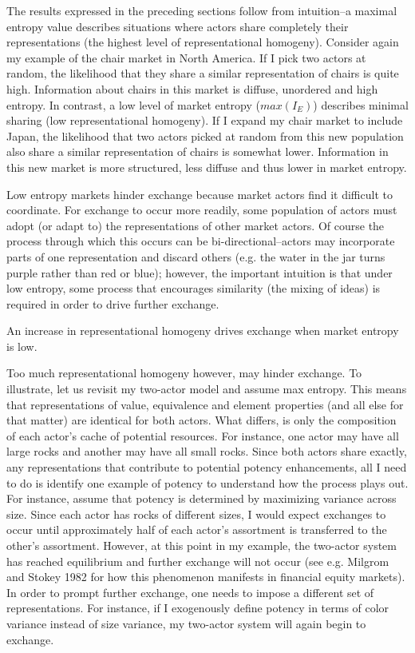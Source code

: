 The results expressed in the preceding sections follow from intuition--a maximal entropy value describes situations where actors share completely their representations (the highest level of representational homogeny). Consider again my example of the chair market in North America. If I pick two actors at random, the likelihood that they share a similar representation of chairs is quite high. Information about chairs in this market is diffuse, unordered and high entropy. In contrast, a low level of market entropy ($max(I_E)$) describes minimal sharing (low representational homogeny). If I expand my chair market to include Japan, the likelihood that two actors picked at random from this new population also share a similar representation of chairs is somewhat lower. Information in this new market is more structured, less diffuse and thus lower in market entropy. 
 
Low entropy markets hinder exchange because market actors find it difficult to coordinate. For exchange to occur more readily, some population of actors must adopt (or adapt to) the representations of other market actors. Of course the process through which this occurs can be bi-directional--actors may incorporate parts of one representation and discard others (e.g. the water in the jar turns purple rather than red or blue); however, the important intuition is that under low entropy, some process that encourages similarity (the mixing of ideas) is required in order to drive further exchange.
 
\begin{prop}
An increase in representational homogeny drives exchange when market entropy is low.
\end{prop}

Too much representational homogeny however, may hinder exchange. To illustrate, let us revisit my two-actor model and assume max entropy. This means that representations of value, equivalence and element properties (and all else for that matter) are identical for both actors. What differs, is only the composition of each actor's cache of potential resources. For instance, one actor may have all large rocks and another may have all small rocks. Since both actors share exactly, any representations that contribute to potential potency enhancements, all I need to do is identify one example of potency to understand how the process plays out. For instance, assume that potency is determined by maximizing variance across size. Since each actor has rocks of different sizes, I would expect exchanges to occur until approximately half of each actor's assortment is transferred to the other's assortment. However, at this point in my example, the two-actor system has reached equilibrium and further exchange will not occur (see e.g. Milgrom and Stokey 1982 for how this phenomenon manifests in financial equity markets). In order to prompt further exchange, one needs to impose a different set of representations. For instance, if I exogenously define potency in terms of color variance instead of size variance, my two-actor system will again begin to exchange.
 
